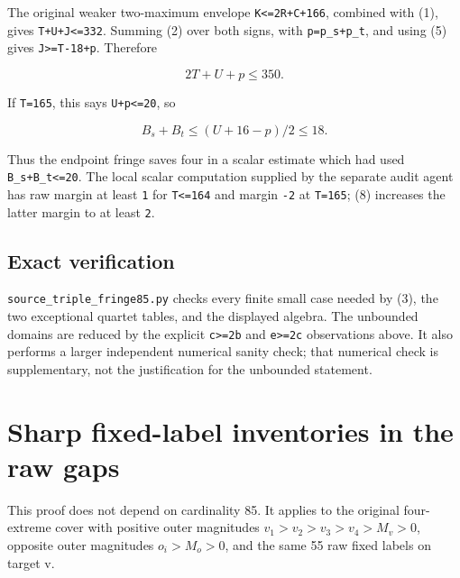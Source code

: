 \documentclass[10pt,a4paper]{article}
\theoremstyle{definition}
\begin{document}
The original weaker two-maximum envelope
\texttt{K<=\allowbreak{}2R+\allowbreak{}C+\allowbreak{}166},\allowbreak{} combined with (1),\allowbreak{} gives
\texttt{T+\allowbreak{}U+\allowbreak{}J<=\allowbreak{}332}. Summing (2) over both signs,\allowbreak{} with
\texttt{p=\allowbreak{}p\_\allowbreak{}\allowbreak{}s+\allowbreak{}p\_\allowbreak{}\allowbreak{}t},\allowbreak{} and using (5) gives
\texttt{J>=\allowbreak{}T-18+\allowbreak{}p}. Therefore

\[
 2T+\allowbreak{}U+\allowbreak{}p\le350.
\]

If \texttt{T=\allowbreak{}165},\allowbreak{} this says
\texttt{U+\allowbreak{}p<=\allowbreak{}20},\allowbreak{} so

\[
                 B_s+\allowbreak{}B_t\le(U+\allowbreak{}16-p)/2\le18.          \tag{8}
\]

Thus the endpoint fringe saves four in a scalar estimate which had used
\texttt{B\_\allowbreak{}\allowbreak{}s+\allowbreak{}B\_\allowbreak{}\allowbreak{}t<=\allowbreak{}20}. The local scalar computation
supplied by the separate audit agent has raw margin at least
\texttt{1} for \texttt{T<=\allowbreak{}164} and
margin \texttt{-2} at \texttt{T=\allowbreak{}165};
(8) increases the latter margin to at least \texttt{2}.

\hypertarget{exact-verification}{%
\subsection{Exact verification}\label{exact-verification}}

\texttt{source\_\allowbreak{}\allowbreak{}triple\_\allowbreak{}\allowbreak{}fringe85.py} checks every
finite small case needed by (3),\allowbreak{} the two exceptional quartet tables,\allowbreak{} and
the displayed algebra. The unbounded domains are reduced by the explicit
\texttt{c>=\allowbreak{}2b} and \texttt{e>=\allowbreak{}2c}
observations above. It also performs a larger independent numerical
sanity check; that numerical check is supplementary,\allowbreak{} not the
justification for the unbounded statement.

\clearpage
\hypertarget{sharp-fixed-label-inventories-in-the-raw-gaps}{%
\section{Sharp fixed-label inventories in the raw
gaps}\label{sharp-fixed-label-inventories-in-the-raw-gaps}}

This proof does not depend on cardinality 85. It applies to the original
four-extreme cover with positive outer magnitudes
\(v_1>v_2>v_3>v_4>M_v>0\),\allowbreak{} opposite outer magnitudes \(o_i>M_o>0\),\allowbreak{} and
the same 55 raw fixed labels on target v.
\end{document}
